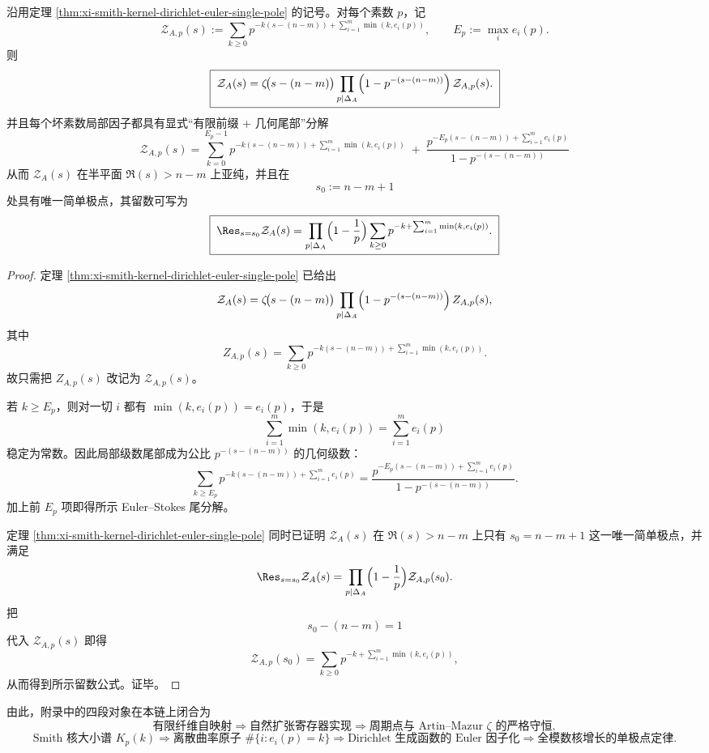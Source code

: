 \begin{theorem}\label{thm:xi-smith-kernel-dirichlet-euler-stokes-tail-residue}
沿用定理 \ref{thm:xi-smith-kernel-dirichlet-euler-single-pole} 的记号。对每个素数 \(p\)，记
\[
\mathcal Z_{A,p}(s):=
\sum_{k\ge 0}p^{-k(s-(n-m))+\sum_{i=1}^{m}\min(k,e_i(p))},
\qquad
E_p:=\max_i e_i(p).
\]
则
\[
\boxed{\;
\mathcal Z_A(s)
=
\zeta\!\bigl(s-(n-m)\bigr)
\prod_{p\mid \Delta_A}
\Bigl(1-p^{-(s-(n-m))}\Bigr)\,
\mathcal Z_{A,p}(s).\;}
\]
并且每个坏素数局部因子都具有显式“有限前缀 + 几何尾部”分解
\[
\boxed{\;
\mathcal Z_{A,p}(s)
=
\sum_{k=0}^{E_p-1}
p^{-k(s-(n-m))+\sum_{i=1}^{m}\min(k,e_i(p))}
\;+\;
\frac{
p^{-E_p(s-(n-m))+\sum_{i=1}^{m}e_i(p)}
}{
1-p^{-(s-(n-m))}}
\;}
\]
从而 \(\mathcal Z_A(s)\) 在半平面 \(\Re(s)>n-m\) 上亚纯，并且在
\[
s_0:=n-m+1
\]
处具有唯一简单极点，其留数可写为
\[
\boxed{\;
\Res_{s=s_0}\mathcal Z_A(s)
=
\prod_{p\mid \Delta_A}
\Bigl(1-\frac1p\Bigr)
\sum_{k\ge 0}p^{-k+\sum_{i=1}^{m}\min(k,e_i(p))}.
\;}
\]
\end{theorem}
\begin{proof}
定理 \ref{thm:xi-smith-kernel-dirichlet-euler-single-pole} 已给出
\[
\mathcal Z_A(s)
=
\zeta\!\bigl(s-(n-m)\bigr)
\prod_{p\mid \Delta_A}
\Bigl(1-p^{-(s-(n-m))}\Bigr)\,
Z_{A,p}(s),
\]
其中
\[
Z_{A,p}(s)
=
\sum_{k\ge 0}p^{-k(s-(n-m))+\sum_{i=1}^{m}\min(k,e_i(p))}.
\]
故只需把 \(Z_{A,p}(s)\) 改记为 \(\mathcal Z_{A,p}(s)\)。

若 \(k\ge E_p\)，则对一切 \(i\) 都有 \(\min(k,e_i(p))=e_i(p)\)，于是
\[
\sum_{i=1}^{m}\min(k,e_i(p))=\sum_{i=1}^{m}e_i(p)
\]
稳定为常数。因此局部级数尾部成为公比
\(
p^{-(s-(n-m))}
\)
的几何级数：
\[
\sum_{k\ge E_p}
p^{-k(s-(n-m))+\sum_{i=1}^{m}e_i(p)}
=
\frac{
p^{-E_p(s-(n-m))+\sum_{i=1}^{m}e_i(p)}
}{
1-p^{-(s-(n-m))}}.
\]
加上前 \(E_p\) 项即得所示 Euler--Stokes 尾分解。

定理 \ref{thm:xi-smith-kernel-dirichlet-euler-single-pole} 同时已证明 \(\mathcal Z_A(s)\) 在 \(\Re(s)>n-m\) 上只有 \(s_0=n-m+1\) 这一唯一简单极点，并满足
\[
\Res_{s=s_0}\mathcal Z_A(s)
=
\prod_{p\mid \Delta_A}\Bigl(1-\frac1p\Bigr)\mathcal Z_{A,p}(s_0).
\]
把
\[
s_0-(n-m)=1
\]
代入 \(\mathcal Z_{A,p}(s)\) 即得
\[
\mathcal Z_{A,p}(s_0)
=
\sum_{k\ge 0}p^{-k+\sum_{i=1}^{m}\min(k,e_i(p))},
\]
从而得到所示留数公式。证毕。
\end{proof}

由此，附录中的四段对象在本链上闭合为
\[
\text{有限纤维自映射}
\Longrightarrow
\text{自然扩张寄存器实现}
\Longrightarrow
\text{周期点与 Artin--Mazur }\zeta\text{ 的严格守恒},
\]
\[
\text{Smith 核大小谱 }K_p(k)
\Longrightarrow
\text{离散曲率原子 }\#\{i:e_i(p)=k\}
\Longrightarrow
\text{Dirichlet 生成函数的 Euler 因子化}
\Longrightarrow
\text{全模数核增长的单极点定律}.
\]





\endinput
